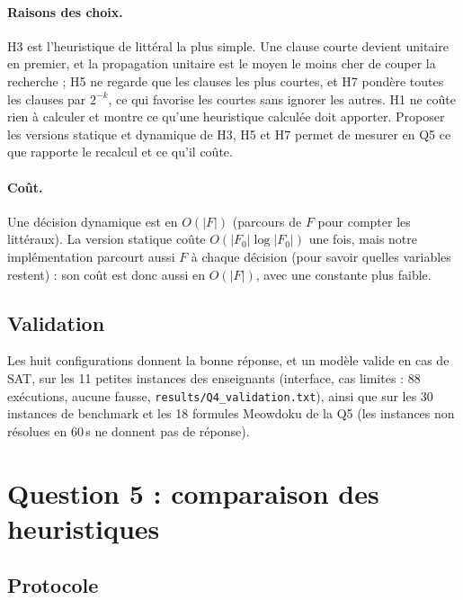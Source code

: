 \documentclass[11pt,a4paper]{article}
\begin{document}
\paragraph{Raisons des choix.} H3 est l'heuristique de littéral la plus simple. Une clause courte devient unitaire en premier, et la propagation unitaire est le moyen le moins cher de couper la recherche ; H5 ne regarde que les clauses les plus courtes, et H7 pondère toutes les clauses par $2^{-k}$, ce qui favorise les courtes sans ignorer les autres. H1 ne coûte rien à calculer et montre ce qu'une heuristique calculée doit apporter. Proposer les versions statique et dynamique de H3, H5 et H7 permet de mesurer en Q5 ce que rapporte le recalcul et ce qu'il coûte.

\paragraph{Coût.} Une décision dynamique est en $O(|F|)$ (parcours de $F$ pour compter les littéraux). La version statique coûte $O(|F_0|\log|F_0|)$ une fois, mais notre implémentation parcourt aussi $F$ à chaque décision (pour savoir quelles variables restent) : son coût est donc aussi en $O(|F|)$, avec une constante plus faible.

\subsection{Validation}
Les huit configurations donnent la bonne réponse, et un modèle valide en cas de SAT, sur les 11 petites instances des enseignants (interface, cas limites : 88 exécutions, aucune fausse, \texttt{results/Q4\_validation.txt}), ainsi que sur les 30 instances de benchmark et les 18 formules Meowdoku de la Q5 (les instances non résolues en 60\,s ne donnent pas de réponse).

\section{Question 5 : comparaison des heuristiques}\label{sec:q5}

\subsection{Protocole}
\end{document}
